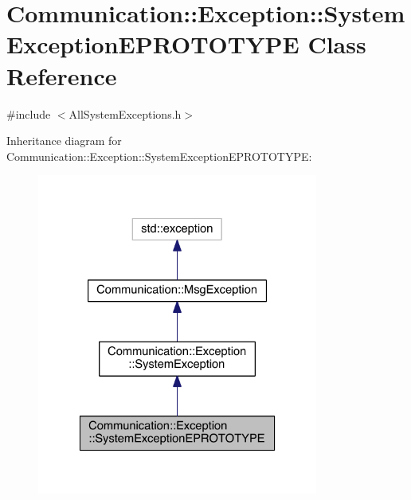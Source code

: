 \hypertarget{class_communication_1_1_exception_1_1_system_exception_e_p_r_o_t_o_t_y_p_e}{}\section{Communication\+:\+:Exception\+:\+:System\+Exception\+E\+P\+R\+O\+T\+O\+T\+Y\+P\+E Class Reference}
\label{class_communication_1_1_exception_1_1_system_exception_e_p_r_o_t_o_t_y_p_e}


{\ttfamily \#include $<$All\+System\+Exceptions.\+h$>$}



Inheritance diagram for Communication\+:\+:Exception\+:\+:System\+Exception\+E\+P\+R\+O\+T\+O\+T\+Y\+P\+E\+:\nopagebreak
\begin{figure}[H]
\begin{center}
\leavevmode
\includegraphics[width=262pt]{class_communication_1_1_exception_1_1_system_exception_e_p_r_o_t_o_t_y_p_e__inherit__graph}
\end{center}
\end{figure}


